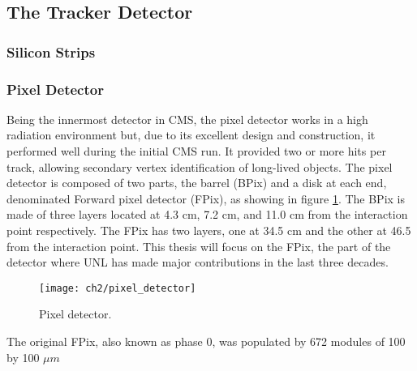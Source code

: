 \subsection{The Tracker Detector}


\subsubsection{Silicon Strips}


\subsubsection{Pixel Detector}
Being the innermost detector in CMS, the pixel detector works in a high radiation environment but, due to its excellent design and construction, it performed well during the initial CMS run. It provided two or more hits per track, allowing secondary vertex identification of long-lived objects. The pixel detector is composed of two parts, the barrel (BPix) and a disk at each end, denominated Forward pixel detector (FPix), as showing in figure \ref{pixeldetector}. The BPix is made of three layers located at 4.3 cm, 7.2 cm, and 11.0 cm from the interaction point respectively. The FPix has two layers, one at 34.5 cm and the other at 46.5 from the interaction point. This thesis will focus on the FPix, the part of the detector where UNL has made major contributions in the last {} three decades.  

\begin{figure}[!h]
	\centering
	\texttt{[image: ch2/pixel\_detector]}
	\caption[Pixel detector]{Pixel detector.}
	\label{pixeldetector}
\end{figure}

  

The original FPix, also known as phase 0, was populated by 672 modules of 100 by 100 $\mu m$ 





